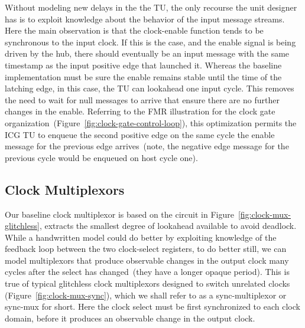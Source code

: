 Without modeling new delays in the the TU, the only recourse the unit designer
has is to exploit knowledge about the behavior of the input message streams.
Here the main observation is that the clock-enable function tends to be
synchronous to the input clock.  If this is the case, and the enable signal is
being driven by the hub, there should eventually be an input message with the
same timestamp as the input positive edge that launched it.  Whereas the
baseline implementation must be sure the enable remains stable until the time of
the latching edge, in this case, the TU can lookahead one input cycle.
This removes the need to wait for null messages to arrive that ensure there are no
further changes in the enable. Referring to the FMR illustration for the clock
gate organization~(Figure~\ref{fig:clock-gate-control-loop}), this optimization
permits the ICG TU to enqueue the second positive edge on the same cycle the
enable message for the previous edge arrives~(note, the negative edge message
for the previous cycle would be enqueued on host cycle one).

\subsection{Clock Multiplexors}
Our baseline clock multiplexor is based on the circuit in
Figure~\ref{fig:clock-mux-glitchless}, extracts the smallest degree of
lookahead available to avoid deadlock. While a handwritten model could do
better by exploiting knowledge of the feedback loop between the two
clock-select registers, to do better still, we can model multiplexors that produce observable changes
in the output clock many cycles after the select has changed~(they have a longer opaque period).
This is true of typical glitchless clock multiplexors designed to switch
unrelated clocks (Figure~\ref{fig:clock-mux-sync}), which we shall refer to as
a sync-multiplexor or sync-mux for short. Here the clock select must be first synchronized to each
clock domain, before it produces an observable change in the output
clock.

